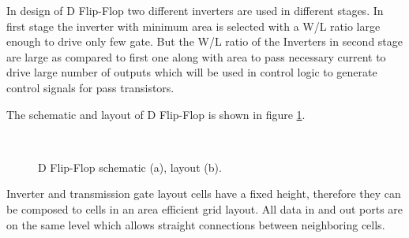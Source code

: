 \documentclass[parskip,oneside,colorbacktitle,10pt,accentcolor=tud1b,table]{tudreport}
\begin{document}
{In design of D Flip-Flop two different inverters are used in different stages. In first stage the inverter with minimum area is selected with a W/L ratio large enough to drive only few gate. But the W/L ratio of the Inverters in second stage are large as compared to first one along with area to pass necessary current to drive large number of outputs which will be used in control logic to generate control signals for pass transistors. 

The schematic and layout of D Flip-Flop is shown in figure \ref{fig:dff}. 

\begin{figure}[H]
     \begin{center}
        \\
        \caption{D Flip-Flop schematic (a), layout (b).}
        \label{fig:dff}
    \end{center}
\end{figure}

Inverter and transmission gate layout cells have a fixed height, therefore they can be composed to cells in an area efficient grid layout. All data in and out ports are on the same level which allows straight connections between neighboring cells.

}
\end{document}
